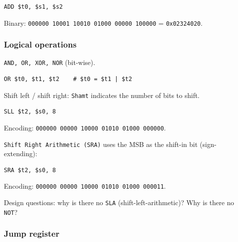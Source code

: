 \begin{eg}
\leavevmode
\begin{lstlisting}
ADD $t0, $s1, $s2
\end{lstlisting}
\begin{center}
\end{center}
Binary: \texttt{000000 10001 10010 01000 00000 100000} \quad =\quad
\texttt{0x02324020}.
\end{eg}

\subsubsection{Logical operations}

\texttt{AND, OR, XOR, NOR} (bit-wise).
\begin{lstlisting}
OR $t0, $t1, $t2    # $t0 = $t1 | $t2
\end{lstlisting}
Shift left / shift right: \texttt{Shamt} indicates the number of bits to
shift.
\begin{eg}
\leavevmode
\begin{lstlisting}
SLL $t2, $s0, 8
\end{lstlisting}
Encoding: \texttt{000000 00000 10000 01010 01000 000000}.
\end{eg}

\texttt{Shift Right Arithmetic (SRA)} uses the MSB as the shift-in bit
(sign-extending):
\begin{eg}
\leavevmode
\begin{lstlisting}
SRA $t2, $s0, 8
\end{lstlisting}
Encoding: \texttt{000000 00000 10000 01010 01000 000011}.
\end{eg}

\begin{remark}
Design questions: why is there no \texttt{SLA} (shift-left-arithmetic)?
Why is there no \texttt{NOT}?
\end{remark}

\subsubsection{Jump register}


